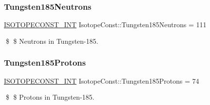 \subsubsection{\texorpdfstring{Tungsten185\+Neutrons}{Tungsten185Neutrons}}
{\footnotesize\ttfamily \mbox{\hyperlink{group___isotope_const-_macros_ga5f18360b3e99483a35c32d789e62621c}{I\+S\+O\+T\+O\+P\+E\+C\+O\+N\+S\+T\+\_\+\+I\+NT}} Isotope\+Const\+::\+Tungsten185\+Neutrons = 111}

\$ \$ Neutrons in Tungsten-\/185. \mbox{\label{group___isotope_const-_tungsten-_w185_ga7fb53bc8a25b8db6e4c58388a621af2b}} 
\subsubsection{\texorpdfstring{Tungsten185\+Protons}{Tungsten185Protons}}
{\footnotesize\ttfamily \mbox{\hyperlink{group___isotope_const-_macros_ga5f18360b3e99483a35c32d789e62621c}{I\+S\+O\+T\+O\+P\+E\+C\+O\+N\+S\+T\+\_\+\+I\+NT}} Isotope\+Const\+::\+Tungsten185\+Protons = 74}

\$ \$ Protons in Tungsten-\/185. 